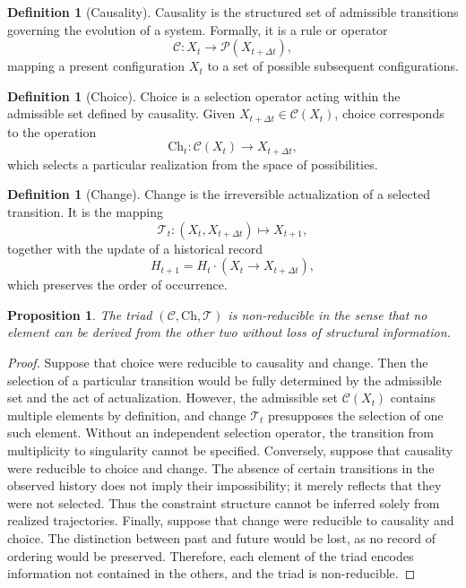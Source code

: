 \documentclass[11pt,a4paper]{article}
\newtheorem{proposition}[theorem]{Proposition}
\theoremstyle{definition}
\newtheorem{definition}[theorem]{Definition}
\theoremstyle{remark}
\begin{document}
\begin{definition}[Causality]
Causality is the structured set of admissible transitions governing the evolution of a system. Formally, it is a rule or operator
\[
\mathcal{C} : X_t \rightarrow \mathcal{P}(X_{t+\Delta t}),
\]
mapping a present configuration $X_t$ to a set of possible subsequent configurations.
\end{definition}

\begin{definition}[Choice]
Choice is a selection operator acting within the admissible set defined by causality. Given $X_{t+\Delta t} \in \mathcal{C}(X_t)$, choice corresponds to the operation
\[
\mathrm{Ch}_t : \mathcal{C}(X_t) \rightarrow X_{t+\Delta t},
\]
which selects a particular realization from the space of possibilities.
\end{definition}

\begin{definition}[Change]
Change is the irreversible actualization of a selected transition. It is the mapping
\[
\mathcal{T}_t : (X_t, X_{t+\Delta t}) \mapsto X_{t+1},
\]
together with the update of a historical record
\[
H_{t+1} = H_t \cdot (X_t \rightarrow X_{t+\Delta t}),
\]
which preserves the order of occurrence.
\end{definition}

\begin{proposition}
The triad $(\mathcal{C}, \mathrm{Ch}, \mathcal{T})$ is non-reducible in the sense that no element can be derived from the other two without loss of structural information.
\end{proposition}

\begin{proof}
Suppose that choice were reducible to causality and change. Then the selection of a particular transition would be fully determined by the admissible set and the act of actualization. However, the admissible set $\mathcal{C}(X_t)$ contains multiple elements by definition, and change $\mathcal{T}_t$ presupposes the selection of one such element. Without an independent selection operator, the transition from multiplicity to singularity cannot be specified. Conversely, suppose that causality were reducible to choice and change. The absence of certain transitions in the observed history does not imply their impossibility; it merely reflects that they were not selected. Thus the constraint structure cannot be inferred solely from realized trajectories. Finally, suppose that change were reducible to causality and choice. The distinction between past and future would be lost, as no record of ordering would be preserved. Therefore, each element of the triad encodes information not contained in the others, and the triad is non-reducible.
\end{proof}
\end{document}
